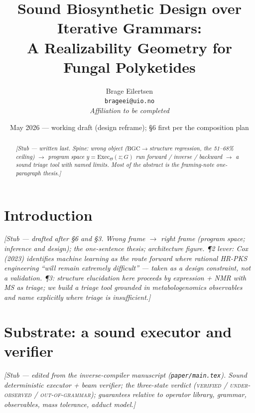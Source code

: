 \documentclass[11pt]{article}
\title{\textbf{Sound Biosynthetic Design over Iterative Grammars:\\A Realizability Geometry for Fungal Polyketides}}
\author{Brage Eilertsen\\
\small \texttt{brageei@uio.no}\\
\small \textit{Affiliation to be completed}}
\date{May 2026 --- working draft (design reframe); \S6 first per the composition plan}
\newcommand{\code}[1]{\texttt{#1}}
\newcommand{\Exec}{\ensuremath{\mathrm{Exec}}}
\begin{document}
\maketitle


\begin{abstract}
\textit{[Stub --- written last. Spine: wrong object ($\mathrm{BGC}\!\to\!$structure regression, the
51--68\% ceiling) $\to$ program space $y=\Exec_\Theta(z;G)$ run forward / inverse / backward $\to$ a
sound triage tool with named limits. Most of the abstract is the framing-note one-paragraph thesis.]}
\end{abstract}

\section{Introduction}\label{sec:intro}
\textit{[Stub --- drafted after \S6 and \S3. Wrong frame $\to$ right frame (program space; inference
\emph{and} design); the one-sentence thesis; architecture figure. \P2 lever: Cox (2023) identifies
machine learning as the route forward where rational HR-PKS engineering ``will remain extremely
difficult'' --- taken as a design \emph{constraint}, not a validation. \P3: structure elucidation here
proceeds by expression + NMR with MS as triage; we build a triage tool grounded in metabologenomics
observables and name explicitly where triage is insufficient.]}

\section{Substrate: a sound executor and verifier}\label{sec:substrate}
\textit{[Stub --- edited from the inverse-compiler manuscript (\code{paper/main.tex}). Sound
deterministic executor + beam verifier; the three-state verdict (\textsc{verified} /
\textsc{under-observed} / \textsc{out-of-grammar}); guarantees relative to operator library, grammar,
observables, mass tolerance, adduct model.]}
\end{document}
